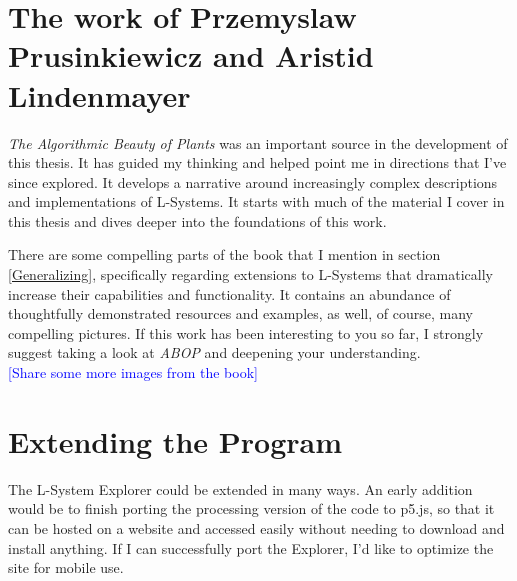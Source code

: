 \documentclass[12pt,twoside]{reedthesis}
\begin{document}
	


\section{The work of Przemyslaw Prusinkiewicz and Aristid Lindenmayer}
	
	\textit{The Algorithmic Beauty of Plants} was an important source in the development of this thesis. It has guided my thinking and helped point me in directions that I've since explored. It develops a narrative around increasingly complex descriptions and implementations of L-Systems. It starts with much of the material I cover in this thesis and dives deeper into the foundations of this work.
	
	There are some compelling parts of the book that I mention in section \ref{Generalizing}, specifically regarding extensions to L-Systems that dramatically increase their capabilities and functionality. It contains an abundance of thoughtfully demonstrated resources and examples, as well, of course, many compelling pictures. If this work has been interesting to you so far, I strongly suggest taking a look at \textit{ABOP} and deepening your understanding.\\
	
	\textcolor{blue}{[Share some more images from the book]}
	
\section{Extending the Program}
\label{Extensions}

	The L-System Explorer could be extended in many ways. An early addition would be to finish porting the processing version of the code to p5.js, so that it can be hosted on a website and accessed easily without needing to download and install anything. If I can successfully port the Explorer, I'd like to optimize the site for mobile use.
	
\end{document}
